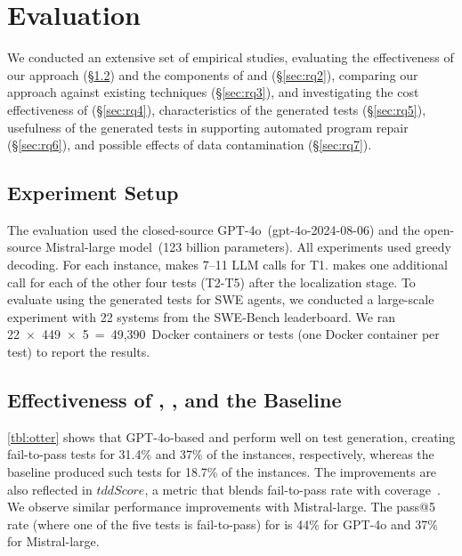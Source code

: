 \section{Evaluation}

We conducted an extensive set of empirical studies, evaluating the effectiveness
of our approach (\S\ref{sec:rq1}) and the components of \solx and \soly
(\S\ref{sec:rq2}), comparing our approach against existing techniques
(\S\ref{sec:rq3}), and investigating the cost effectiveness of \solx
(\S\ref{sec:rq4}), characteristics of the generated tests (\S\ref{sec:rq5}),
usefulness of the generated tests in supporting automated program repair
(\S\ref{sec:rq6}), and possible effects of data contamination (\S\ref{sec:rq7}).

\subsection{Experiment Setup}
\label{sec:setup}

The evaluation used the closed-source GPT-4o~(gpt-4o-2024-08-06)
and the open-source Mistral-large model~(123 billion parameters).
All experiments used greedy decoding. For each instance, \solx makes 7--11 LLM
calls for T1. \soly makes one additional call for each of the other four tests (T2-T5) after the
localization stage. To evaluate using the generated tests for SWE agents, we conducted a large-scale
experiment with 22 systems from the SWE-Bench leaderboard. We ran \mbox{22 × 449 × 5 =
49,390 Docker} containers or tests (one Docker container per test) to report the
results.


\subsection{Effectiveness of \solx, \soly, and the Baseline}
\label{sec:rq1}

\cref{tbl:otter} shows that GPT-4o-based \solx and \soly perform well on test
generation, creating fail-to-pass tests for 31.4\% and 37\% of the instances,
respectively, whereas the baseline produced such tests for 18.7\% of the
instances. The improvements are also reflected in $\mathit{tddScore}$,
a metric that blends fail-to-pass rate with coverage~\cite{ahmed2024tdd}. We
observe similar performance improvements with Mistral-large. The pass@5 rate
(where one of the five tests is fail-to-pass) for \soly is 44\% for GPT-4o and 37\%
for Mistral-large.


